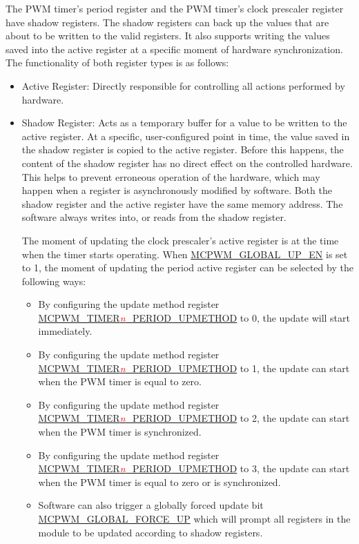 \documentclass[main\_\_EN.tex]{subfiles}
\begin{document}
The PWM timer's period register and the PWM timer's clock prescaler register have shadow registers. The shadow registers can back up the values that are about to be written to the valid registers. It also supports writing the values saved into the active register at a specific moment of hardware synchronization. The functionality of both register types is as follows:
\begin{itemize}
    \item Active Register: Directly responsible for controlling all actions performed by hardware.
    \item Shadow Register: Acts as a temporary buffer for a value to be written to the active register. At a specific, user-configured point in time, the value saved in the shadow register is copied to the active register. Before this happens, the content of the shadow register has no direct effect on the controlled hardware. This helps to prevent erroneous operation of the hardware, which may happen when a register is asynchronously modified by software. Both the shadow register and the active register have the same memory address. The software always writes into, or reads from the shadow register.

    The moment of updating the clock prescaler's active register is at the time when the timer starts operating. When \hyperref[fielddesc:MCPWMGLOBALUPEN]{MCPWM\_GLOBAL\_UP\_EN} is set to 1, the moment of updating the period active register can be selected by the following ways:

    \begin{itemize}
    \item By configuring the update method register \hyperref[fielddesc:MCPWMTIMERNPERIODUPMETHOD]{MCPWM\_TIMER\textcolor{red}{\it{n}}\_PERIOD\_UPMETHOD} to 0, the update will start immediately.
    \item By configuring the update method register \hyperref[fielddesc:MCPWMTIMERNPERIODUPMETHOD]{MCPWM\_TIMER\textcolor{red}{\it{n}}\_PERIOD\_UPMETHOD} to 1, the update can start when the PWM timer is equal to zero.
    \item By configuring the update method register \hyperref[fielddesc:MCPWMTIMERNPERIODUPMETHOD]{MCPWM\_TIMER\textcolor{red}{\it{n}}\_PERIOD\_UPMETHOD} to 2, the update can start when the PWM timer is synchronized.
    \item By configuring the update method register \hyperref[fielddesc:MCPWMTIMERNPERIODUPMETHOD]{MCPWM\_TIMER\textcolor{red}{\it{n}}\_PERIOD\_UPMETHOD} to 3, the update can start when the PWM timer is equal to zero or is synchronized.
    \item Software can also trigger a globally forced update bit\\ \hyperref[fielddesc:MCPWMGLOBALFORCEUP]{MCPWM\_GLOBAL\_FORCE\_UP} which will prompt all registers in the module to be updated according to shadow registers.
    \end{itemize}
\end{itemize}
\end{document}
